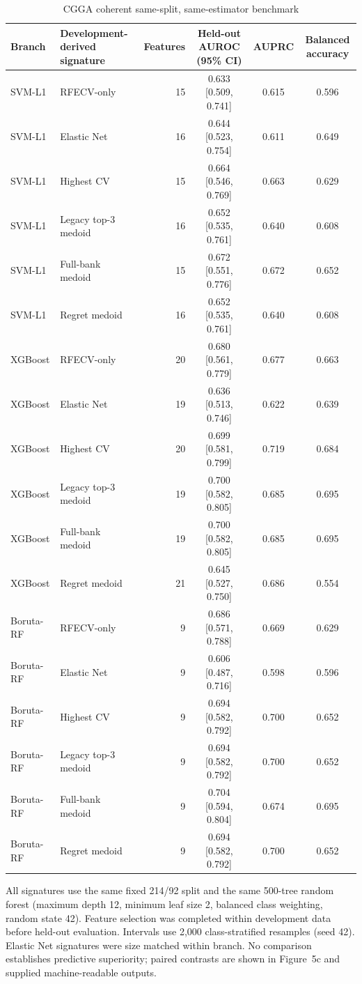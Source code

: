 \begin{table}[H]
\centering
\caption{CGGA coherent same-split, same-estimator benchmark}
\label{tab:supp16}
\scriptsize
\begin{tabular}{llrccc}
\toprule
Branch & Development-derived signature & Features & Held-out AUROC (95\% CI) & AUPRC & Balanced accuracy \\
\midrule
SVM-L1 & RFECV-only & 15 & 0.633 [0.509, 0.741] & 0.615 & 0.596 \\
SVM-L1 & Elastic Net & 16 & 0.644 [0.523, 0.754] & 0.611 & 0.649 \\
SVM-L1 & Highest CV & 15 & 0.664 [0.546, 0.769] & 0.663 & 0.629 \\
SVM-L1 & Legacy top-3 medoid & 16 & 0.652 [0.535, 0.761] & 0.640 & 0.608 \\
SVM-L1 & Full-bank medoid & 15 & 0.672 [0.551, 0.776] & 0.672 & 0.652 \\
SVM-L1 & Regret medoid & 16 & 0.652 [0.535, 0.761] & 0.640 & 0.608 \\
XGBoost & RFECV-only & 20 & 0.680 [0.561, 0.779] & 0.677 & 0.663 \\
XGBoost & Elastic Net & 19 & 0.636 [0.513, 0.746] & 0.622 & 0.639 \\
XGBoost & Highest CV & 20 & 0.699 [0.581, 0.799] & 0.719 & 0.684 \\
XGBoost & Legacy top-3 medoid & 19 & 0.700 [0.582, 0.805] & 0.685 & 0.695 \\
XGBoost & Full-bank medoid & 19 & 0.700 [0.582, 0.805] & 0.685 & 0.695 \\
XGBoost & Regret medoid & 21 & 0.645 [0.527, 0.750] & 0.686 & 0.554 \\
Boruta-RF & RFECV-only & 9 & 0.686 [0.571, 0.788] & 0.669 & 0.629 \\
Boruta-RF & Elastic Net & 9 & 0.606 [0.487, 0.716] & 0.598 & 0.596 \\
Boruta-RF & Highest CV & 9 & 0.694 [0.582, 0.792] & 0.700 & 0.652 \\
Boruta-RF & Legacy top-3 medoid & 9 & 0.694 [0.582, 0.792] & 0.700 & 0.652 \\
Boruta-RF & Full-bank medoid & 9 & 0.704 [0.594, 0.804] & 0.674 & 0.695 \\
Boruta-RF & Regret medoid & 9 & 0.694 [0.582, 0.792] & 0.700 & 0.652 \\
\bottomrule
\end{tabular}
\begin{minipage}{0.98\linewidth}\scriptsize\vspace{0.3em}
All signatures use the same fixed 214/92 split and the same 500-tree random forest (maximum depth 12, minimum leaf size 2, balanced class weighting, random state 42). Feature selection was completed within development data before held-out evaluation. Intervals use 2,000 class-stratified resamples (seed 42). Elastic Net signatures were size matched within branch. No comparison establishes predictive superiority; paired contrasts are shown in Figure~5c and supplied machine-readable outputs.
\end{minipage}
\end{table}
